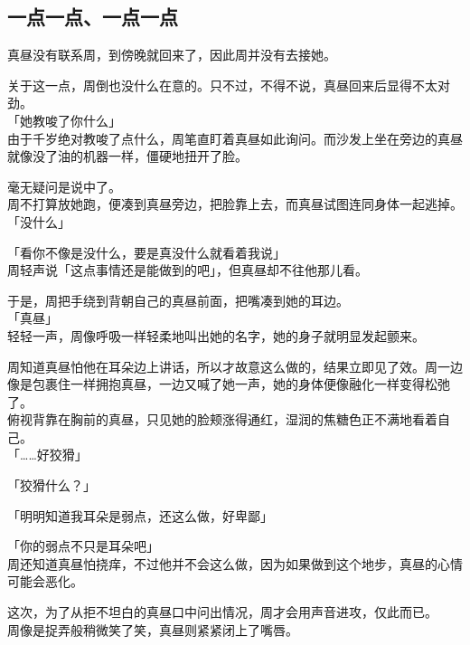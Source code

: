 \subsection{一点一点、一点一点}

真昼没有联系周，到傍晚就回来了，因此周并没有去接她。

关于这一点，周倒也没什么在意的。只不过，不得不说，真昼回来后显得不太对劲。\\

「她教唆了你什么」\\

由于千岁绝对教唆了点什么，周笔直盯着真昼如此询问。而沙发上坐在旁边的真昼就像没了油的机器一样，僵硬地扭开了脸。

毫无疑问是说中了。\\

周不打算放她跑，便凑到真昼旁边，把脸靠上去，而真昼试图连同身体一起逃掉。\\

「没什么」

「看你不像是没什么，要是真没什么就看着我说」\\

周轻声说「这点事情还是能做到的吧」，但真昼却不往他那儿看。

于是，周把手绕到背朝自己的真昼前面，把嘴凑到她的耳边。\\

「真昼」\\

轻轻一声，周像呼吸一样轻柔地叫出她的名字，她的身子就明显发起颤来。

周知道真昼怕他在耳朵边上讲话，所以才故意这么做的，结果立即见了效。周一边像是包裹住一样拥抱真昼，一边又喊了她一声，她的身体便像融化一样变得松弛了。\\

俯视背靠在胸前的真昼，只见她的脸颊涨得通红，湿润的焦糖色正不满地看着自己。\\

「……好狡猾」

「狡猾什么？」

「明明知道我耳朵是弱点，还这么做，好卑鄙」

「你的弱点不只是耳朵吧」\\

周还知道真昼怕挠痒，不过他并不会这么做，因为如果做到这个地步，真昼的心情可能会恶化。

这次，为了从拒不坦白的真昼口中问出情况，周才会用声音进攻，仅此而已。\\

周像是捉弄般稍微笑了笑，真昼则紧紧闭上了嘴唇。

